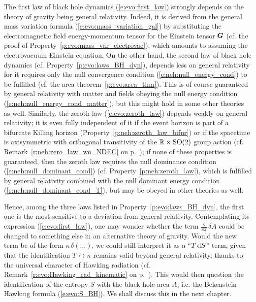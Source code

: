 The first law of black hole dynamics (\ref{e:evo:first_law}) strongly depends
on the theory of gravity being general relativity. Indeed, it is derived
from the general mass variation formula (\ref{e:evo:mass_variation_gal}) by
substituting the electromagnetic field energy-momentum tensor for
the Einstein tensor $\bm{G}$
(cf. the proof of Property~\ref{p:evo:mass_var_electrovac}), which amounts
to assuming the electrovacuum Einstein equation.
On the other hand, the second law of black hole dynamics (cf. Property~\ref{p:evo:laws_BH_dyn}),
depends less on general relativity for it requires only
the null convergence condition (\ref{e:neh:null_energy_cond}) to be fulfilled (cf. the area theorem~\ref{p:evo:area_thm}).
This is of course guaranteed by general relativity
with matter and fields obeying the null energy condition (\ref{e:neh:null_energy_cond_matter}), but
this might hold in some other theories as well.
Similarly, the zeroth law (\ref{e:evo:zeroth_law}) depends weakly on general relativity; it is
even fully independent of it if the event horizon is
part of a bifurcate Killing horizon (Property~\ref{p:neh:zeroth_law_bifur}) or if
the spacetime is axisymmetric with orthogonal transitivity of the $\mathbb{R}\times\mathrm{SO}(2)$ group
action (cf. Remark~\ref{r:neh:zero_law_wo_NDEC} on p.~\pageref{r:neh:zero_law_wo_NDEC}); if none
of these properties is guaranteed, then the zeroth law requires the
null dominance condition (\ref{e:neh:null_dominant_cond}) (cf. Property~\ref{p:neh:zeroth_law}),
which is fulfilled by general relativity combined with the null dominant energy condition
(\ref{e:neh:null_dominant_cond_T}), but may be obeyed in other theories as well.

Hence, among the three laws listed in Property~\ref{p:evo:laws_BH_dyn},
the first one is the most sensitive to
a deviation from general relativity.
Contemplating its expression (\ref{e:evo:first_law}),
one may wonder whether the term
$\frac{\kappa}{8\pi} \, \delta A$
could be changed to something else in an alternative theory of gravity.
Would the new term be of the form $\kappa \, \delta(...)$,
we could still interpret it as a ``$T\, \mathrm{d} S$'' term, given that the identification
$T \leftrightarrow \kappa$ remains valid beyond general relativity, thanks to
the universal character of Hawking radiation (cf. Remark~\ref{r:evo:Hawking_rad_kinematic}
on p.~\pageref{r:evo:Hawking_rad_kinematic}). This would then question
the identification of the entropy $S$ with the black hole area $A$, i.e.
the Bekenstein-Hawking formula (\ref{e:evo:S_BH}). We shall discuss
this in the next chapter.
